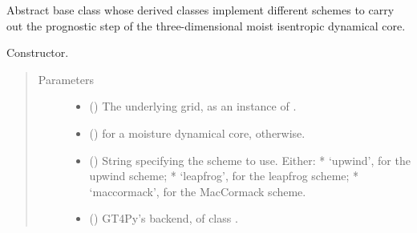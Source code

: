 \documentclass[letterpaper,10pt,english]{sphinxmanual}
\begin{document}
\begin{fulllineitems}
\label{\detokenize{api:dycore.isentropic_prognostic.IsentropicPrognostic}}
Abstract base class whose derived classes implement different schemes to carry out the
prognostic step of the three-dimensional moist isentropic dynamical core.

\begin{fulllineitems}
\label{\detokenize{api:dycore.isentropic_prognostic.IsentropicPrognostic.__init__}}
Constructor.
\begin{quote}\begin{description}
\item[{Parameters}] \leavevmode\begin{itemize}
\item {} 
 () \textendash{} The underlying grid, as an instance of {\hyperref[\detokenize{api:grids.xyz_grid.XYZGrid}]{}}.

\item {} 
 () \textendash{}  for a moisture dynamical core,  otherwise.

\item {} 
 () \textendash{} String specifying the scheme to use. Either:
* ‘upwind’, for the upwind scheme;
* ‘leapfrog’, for the leapfrog scheme;
* ‘maccormack’, for the MacCormack scheme.

\item {} 
 () \textendash{} GT4Py’s backend, of class .

\end{itemize}

\end{description}\end{quote}

\end{fulllineitems}


\end{fulllineitems}
\end{document}
